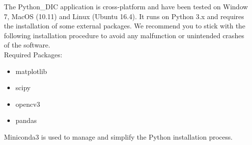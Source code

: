 \indent\indent The Python\_DIC application is cross-platform and have been tested on Window 7, MacOS (10.11) and Linux (Ubuntu 16.4). It runs on Python 3.x and requires the installation of some external packages. We recommend you to stick with the following installation procedure to avoid any malfunction or unintended crashes of the software.\\
\newline Required Packages:
\begin{itemize}
  \item matplotlib
  \item scipy
  \item opencv3
  \item pandas
\end{itemize}
\newline
Miniconda3 is used to manage and simplify the Python installation process.

